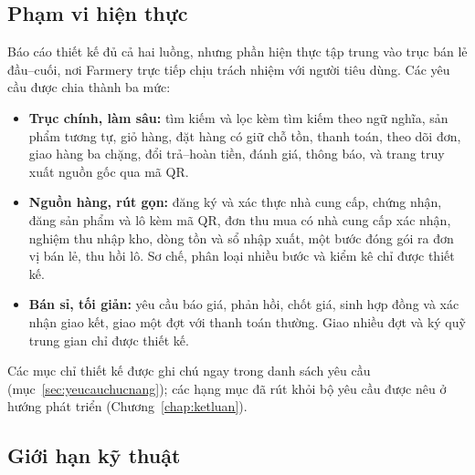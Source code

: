 \subsection{Phạm vi hiện thực}

Báo cáo thiết kế đủ cả hai luồng, nhưng phần hiện thực tập trung vào trục bán lẻ đầu--cuối, nơi Farmery trực tiếp chịu trách nhiệm với người tiêu dùng. Các yêu cầu được chia thành ba mức:
\begin{itemize}
    \item \textbf{Trục chính, làm sâu:} tìm kiếm và lọc kèm tìm kiếm theo ngữ nghĩa, sản phẩm tương tự, giỏ hàng, đặt hàng có giữ chỗ tồn, thanh toán, theo dõi đơn, giao hàng ba chặng, đổi trả--hoàn tiền, đánh giá, thông báo, và trang truy xuất nguồn gốc qua mã QR.
    \item \textbf{Nguồn hàng, rút gọn:} đăng ký và xác thực nhà cung cấp, chứng nhận, đăng sản phẩm và lô kèm mã QR, đơn thu mua có nhà cung cấp xác nhận, nghiệm thu nhập kho, dòng tồn và sổ nhập xuất, một bước đóng gói ra đơn vị bán lẻ, thu hồi lô. Sơ chế, phân loại nhiều bước và kiểm kê chỉ được thiết kế.
    \item \textbf{Bán sỉ, tối giản:} yêu cầu báo giá, phản hồi, chốt giá, sinh hợp đồng và xác nhận giao kết, giao một đợt với thanh toán thường. Giao nhiều đợt và ký quỹ trung gian chỉ được thiết kế.
\end{itemize}
Các mục chỉ thiết kế được ghi chú ngay trong danh sách yêu cầu (mục~\ref{sec:yeucauchucnang}); các hạng mục đã rút khỏi bộ yêu cầu được nêu ở hướng phát triển (Chương~\ref{chap:ketluan}).

\subsection{Giới hạn kỹ thuật}

